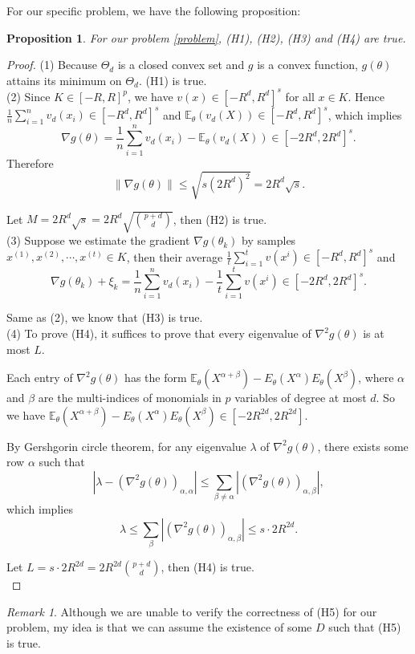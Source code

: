 \documentclass[psamsfonts]{article}
\newtheorem{prop}[thm]{Proposition}
\theoremstyle{definition}
\theoremstyle{remark}
\newtheorem*{rem}{Remark}
\numberwithin{equation} {section}
\begin{document}
For our specific problem, we have the following proposition:
\begin{prop}
For our problem \eqref{problem}, (H1), (H2), (H3) and (H4) are true.
\end{prop}
\begin{proof}
(1) Because $\Theta_d$ is a closed convex set and $g$ is a convex function, $g(\theta)$ attains its minimum on $\Theta_d$. (H1) is true.\\
(2) Since $K \in [-R, R]^p$, we have $v(x) \in [-R^d, R^d]^s$ for all $x\in K$. Hence $\frac{1}{n} \sum_{i = 1}^n v_d( x_i) \in [-R^d, R^d]^s$ and $\mathbb E_\theta(v_d(X)) \in [-R^d, R^d]^s$, which implies
$$\nabla g(\theta) = \frac{1}{n} \sum_{i = 1}^n v_d(x_i) - \mathbb E_\theta(v_d(X)) \in[-2R^d, 2R^d]^s.$$
Therefore $$\|\nabla g(\theta) \| \le \sqrt{s(2R^d)^2}=2R^d\sqrt{s}.$$

Let $M = 2R^d\sqrt{s} = 2R^d\sqrt{p+d \choose d}$, then (H2) is true.\\
(3) Suppose we estimate the gradient $\nabla g(\theta_k)$ by samples $x^{(1)}, x^{(2)}, \cdots, x^{(t)} \in K$, then their average $\frac{1}{t}\sum_{i=1}^t v(x^{i}) \in[-R^d, R^d]^s$ and
$$\nabla g(\theta_k) + \xi_k = \frac{1}{n} \sum_{i = 1}^n v_d(x_i) - \frac{1}{t}\sum_{i=1}^t v(x^{i}) \in[-2R^d, 2R^d]^s.$$

Same as (2), we know that (H3) is true.\\
(4) To prove (H4), it suffices to prove that every eigenvalue of $\nabla^2 g(\theta)$ is at most $L$.

Each entry of $\nabla^2 g(\theta)$ has the form $\mathbb E_\theta(X^{\alpha+\beta}) - E_\theta(X^\alpha)E_\theta(X^\beta)$, where $\alpha$ and $\beta$ are the multi-indices of monomials in $p$ variables of degree at most $d$. So we have $\mathbb E_\theta(X^{\alpha+\beta}) - E_\theta(X^\alpha)E_\theta(X^\beta) \in [-2R^{2d}, 2R^{2d}]$.

By Gershgorin circle theorem, for any eigenvalue $\lambda$ of $\nabla^2 g(\theta)$, there exists some row $\alpha$ such that
\[
|\lambda - (\nabla^2 g(\theta))_{\alpha, \alpha}| \le \sum_{\beta\not=\alpha}|(\nabla^2 g(\theta))_{\alpha, \beta}|,
\]
which implies
\[
\lambda \le \sum_\beta |(\nabla^2 g(\theta))_{\alpha, \beta}| \le s\cdot 2R^{2d}.
\]

Let $L = s\cdot 2R^{2d} = 2R^{2d}{p+d \choose d}$, then (H4) is true.\\
\end{proof}
\begin{rem}
Although we are unable to verify the correctness of (H5) for our problem, my idea is that we can assume the existence of some $D$ such that (H5) is true.
\end{rem}
\end{document}
